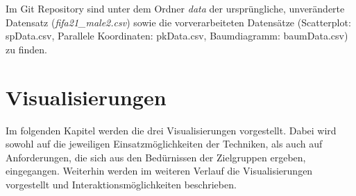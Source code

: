 \documentclass[usegeometry=true]{scrartcl}
\begin{document}
Im Git Repository sind unter dem Ordner \textit{data} der ursprüngliche, unveränderte Datensatz (\textit{fifa21\_male2.csv}) sowie die vorverarbeiteten Datensätze (Scatterplot: spData.csv, Parallele Koordinaten: pkData.csv, Baumdiagramm: baumData.csv) zu finden.

\section{Visualisierungen}
Im folgenden Kapitel werden die drei Visualisierungen vorgestellt. Dabei wird sowohl auf die jeweiligen Einsatzmöglichkeiten der Techniken, als auch auf Anforderungen, die sich aus den Bedürnissen der Zielgruppen ergeben, eingegangen. Weiterhin werden im weiteren Verlauf die Visualisierungen vorgestellt und Interaktionsmöglichkeiten beschrieben.  

\end{document}
